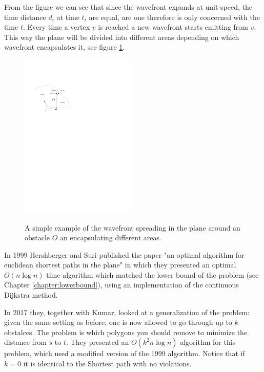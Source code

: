 From the figure we can see that since the wavefront expands at unit-speed, the time distance
$d_i$ at time $t_i$ are equal, are one therefore is only concerned with the time $t$.
Every time a vertex $v$ is reached a new wavefront starts emitting from $v$. This way
the plane will be divided into different areas depending on which wavefront encapsulates it,
see figure \ref{fig:introductiontowavefront}.

\begin{figure}[H]
    \centering
	\includegraphics[width=0.5\textwidth]{figures/introductiontowavefront.pdf}
	\label{fig:introductiontowavefront}
	\caption{A simple example of the wavefront spreading in the plane around an obstacle $O$
	         an encapsulating different areas.}
\end{figure}

In 1999 Hershberger and Suri published the paper "an optimal algorithm for euclidean shortest 
paths in the plane"\cite{HershbergerS99} in which they presented an optimal $O(n\log n)$ time 
algorithm which matched the lower bound of the problem (see Chapter \ref{chapter:lowerbound}), 
using an implementation of the continuous Dijkstra method.

In 2017 they, together with Kumar, looked at a generalization of the problem:
given the same setting as before, one is now allowed to go through up to $k$ obstalces.
The problem is which polygons you should remove to minimize the distance from
$s$ to $t$. They presented an $O(k^2 n\log n)$ algorithm for this problem,
which used a modified version of the 1999 algorithm\cite{HershbergerKS17}.
Notice that if $k=0$ it is identical to the Shortest path with no violations.


